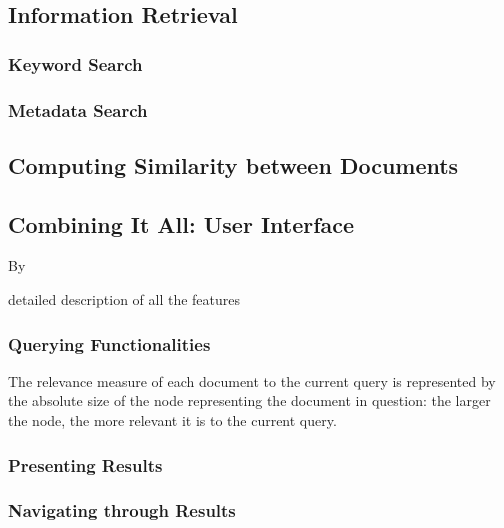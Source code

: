 \subsection {Information Retrieval}
\label{sec:information_retrieval}

\subsubsection{Keyword Search}
\label{sec:keyword_search}

\subsubsection{Metadata Search}
\label{sec:metadata_search}

\subsection {Computing Similarity between Documents}
\label{sec:computing_similarity_between_documents}


	
\subsection {Combining It All: User Interface}

By 
\label{sec:combining_it_all:_user_interface}

\note detailed description of all the features 

\subsubsection {Querying Functionalities}
\label{sec:querying_functionalities}

The relevance measure of each document to the current query is represented by the absolute size of the node representing the document in question: the larger the node, the more relevant it is to the current query.

\subsubsection {Presenting Results}
\label{sec:presenting_results}

\subsubsection {Navigating through Results}
\label{sec:navigation_through_results}